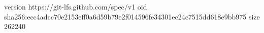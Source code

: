 version https://git-lfs.github.com/spec/v1
oid sha256:ecc4adcc70e2153eff0a6d59b79e2f014596fe34301ec24c7515dd618e9bb975
size 262240
